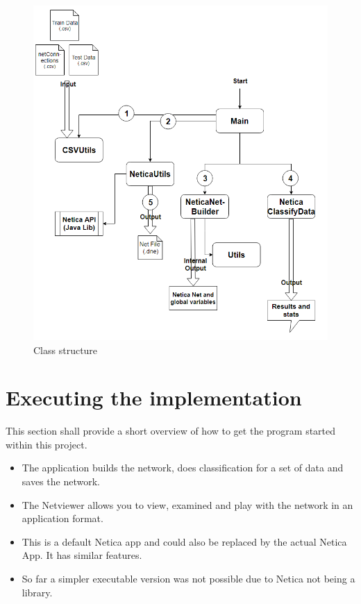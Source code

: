 \documentclass[12pt]{scrartcl}
\begin{document}
\begin{figure}[H]
    \centering
    \includegraphics[width=.9\textwidth]{img/classConnections.PNG}
    \caption{Class structure}
    \label{fig:class_structure}
\end{figure}



\section{Executing the implementation}
\label{sec:getting_started}
This section shall provide a short overview of how to get the program started within this project.

\begin{itemize}
    \item The application builds the network, does classification for a set of data and saves the network.
    \item The Netviewer allows you to view, examined and play with the network in an application format.
    \item This is a default Netica app and could also be replaced by the actual Netica App. It has similar features.
    \item So far a simpler executable version was not possible due to Netica not being a library.
\end{itemize}
\end{document}
